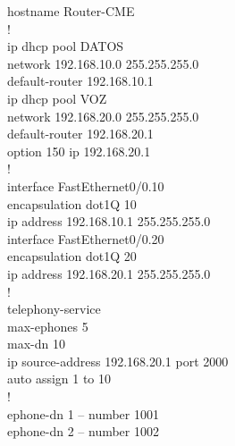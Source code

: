 \documentclass[11pt, letterpaper]{article}
\begin{document}
\begin{tcolorbox}[enhanced, breakable, colback=black!95, colframe=AzulUNAM,
                  title=\textbf{Router-CME -- Inter-VLAN Routing y Servidor de Telefonía}, arc=2mm, boxrule=1pt,
                  attach boxed title to top left={xshift=5mm, yshift=-3mm},
                  boxed title style={colback=AzulUNAM},
                  fontupper=\ttfamily\small\color{white}]
hostname Router-CME\\
!\\
ip dhcp pool DATOS\\
\hspace{1em}network 192.168.10.0 255.255.255.0\\
\hspace{1em}default-router 192.168.10.1\\
ip dhcp pool VOZ\\
\hspace{1em}network 192.168.20.0 255.255.255.0\\
\hspace{1em}default-router 192.168.20.1\\
\hspace{1em}option 150 ip 192.168.20.1\\
!\\
interface FastEthernet0/0.10\\
\hspace{1em}encapsulation dot1Q 10\\
\hspace{1em}ip address 192.168.10.1 255.255.255.0\\
interface FastEthernet0/0.20\\
\hspace{1em}encapsulation dot1Q 20\\
\hspace{1em}ip address 192.168.20.1 255.255.255.0\\
!\\
telephony-service\\
\hspace{1em}max-ephones 5\\
\hspace{1em}max-dn 10\\
\hspace{1em}ip source-address 192.168.20.1 port 2000\\
\hspace{1em}auto assign 1 to 10\\
!\\
ephone-dn 1 -- number 1001\\
ephone-dn 2 -- number 1002
\end{tcolorbox}
\end{document}
